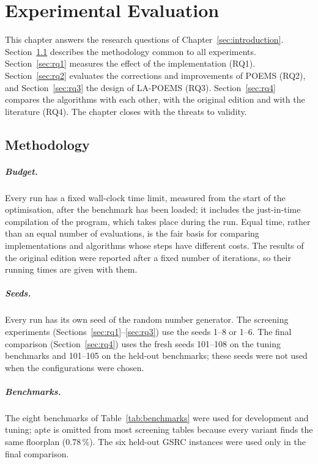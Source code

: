 \chapter{Experimental Evaluation}
\label{sec:testing}

This chapter answers the research questions of Chapter~\ref{sec:introduction}. Section~\ref{sec:method} describes the methodology common to all experiments. Section~\ref{sec:rq1} measures the effect of the implementation (RQ1). Section~\ref{sec:rq2} evaluates the corrections and improvements of POEMS (RQ2), and Section~\ref{sec:rq3} the design of LA-POEMS (RQ3). Section~\ref{sec:rq4} compares the algorithms with each other, with the original edition and with the literature (RQ4). The chapter closes with the threats to validity.

\section{Methodology}
\label{sec:method}

\paragraph{Budget.} Every run has a fixed wall-clock time limit, measured from the start of the optimisation, after the benchmark has been loaded; it includes the just-in-time compilation of the program, which takes place during the run. Equal time, rather than an equal number of evaluations, is the fair basis for comparing implementations and algorithms whose steps have different costs. The results of the original edition were reported after a fixed number of iterations, so their running times are given with them.

\paragraph{Seeds.} Every run has its own seed of the random number generator. The screening experiments (Sections~\ref{sec:rq1}--\ref{sec:rq3}) use the seeds 1--8 or 1--6. The final comparison (Section~\ref{sec:rq4}) uses the fresh seeds 101--108 on the tuning benchmarks and 101--105 on the held-out benchmarks; these seeds were not used when the configurations were chosen.

\paragraph{Benchmarks.} The eight benchmarks of Table~\ref{tab:benchmarks} were used for development and tuning; apte is omitted from most screening tables because every variant finds the same floorplan (0.78\,\%). The six held-out GSRC instances were used only in the final comparison.

